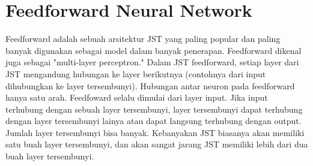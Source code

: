 \section{Feedforward Neural Network}
Feedforward adalah sebuah arsitektur JST yang paling popular dan paling banyak digunakan sebagai model dalam banyak penerapan. Feedforward dikenal juga sebagai "multi-layer perceptron." Dalam JST feedforward, setiap layer dari JST mengandung hubungan ke layer berikutnya (contohnya dari input dihubungkan ke layer tersembunyi). Hubungan antar neuron pada feedforward hanya satu arah. Feedfoward selalu dimulai dari layer input. Jika input terhubung dengan sebuah layer tersembunyi, layer tersembunyi dapat terhubung dengan layer tersembunyi lainya atau dapat langsung terhubung dengan output. Jumlah layer tersembunyi bisa banyak. Kebanyakan JST biasanya akan memiliki satu buah layer tersembunyi, dan akan sangat jarang JST memiliki lebih dari dua buah layer tersembunyi.
